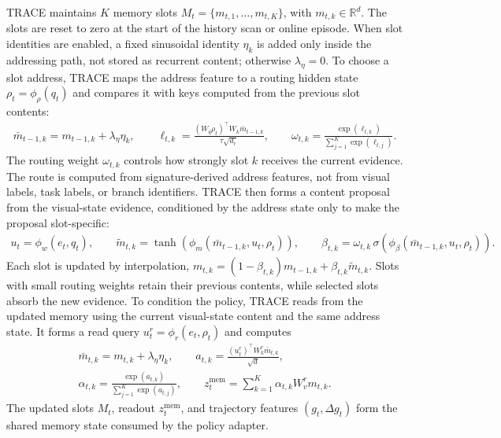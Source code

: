 \documentclass{article}
\begin{document}
TRACE maintains $K$ memory slots $M_t=\{m_{t,1},\ldots,m_{t,K}\}$, with $m_{t,k}\in\mathbb{R}^{d}$. The slots are reset to zero at the start of the history scan or online episode. When slot identities are enabled, a fixed sinusoidal identity $\eta_k$ is added only inside the addressing path, not stored as recurrent content; otherwise $\lambda_{\eta}=0$. To choose a slot address, TRACE maps the address feature to a routing hidden state $\rho_t=\phi_{\rho}(q_t)$ and compares it with keys computed from the previous slot contents:
\begin{align}
    \bar m_{t-1,k}=m_{t-1,k}+\lambda_{\eta}\eta_k,
    \qquad
    \ell_{t,k}=
    \frac{(W_q\rho_t)^\top W_k \bar m_{t-1,k}}
    {\tau\sqrt{d_r}},
    \qquad
    \omega_{t,k}=\frac{\exp(\ell_{t,k})}{\sum_{j=1}^{K}\exp(\ell_{t,j})}.
    \label{eq:route_weights}
\end{align}
The routing weight $\omega_{t,k}$ controls how strongly slot $k$ receives the current evidence. The route is computed from signature-derived address features, not from visual labels, task labels, or branch identifiers. TRACE then forms a content proposal from the visual-state evidence, conditioned by the address state only to make the proposal slot-specific:
\begin{align}
    u_t=\phi_w(e_t,q_t),
    \qquad
    \tilde m_{t,k}=\tanh(\phi_m(\bar m_{t-1,k},u_t,\rho_t)),
    \qquad
    \beta_{t,k}
    =
    \omega_{t,k}\,
    \sigma\!\left(\phi_{\beta}(\bar m_{t-1,k},u_t,\rho_t)\right).
    \label{eq:write_strength}
\end{align}
Each slot is updated by interpolation,
$m_{t,k}=(1-\beta_{t,k})m_{t-1,k}+\beta_{t,k}\tilde m_{t,k}$. Slots with small routing weights retain their previous contents, while selected slots absorb the new evidence. To condition the policy, TRACE reads from the updated memory using the current visual-state content and the same address state. It forms a read query $u_t^{r}=\phi_r(e_t,\rho_t)$ and computes
\begin{align}
    \bar m_{t,k}=m_{t,k}+\lambda_{\eta}\eta_k,
    \qquad
    a_{t,k}=
    \frac{(u_t^{r})^\top W_k^{r}\bar m_{t,k}}{\sqrt d},
    \\
    \alpha_{t,k}=
    \frac{\exp(a_{t,k})}{\sum_{j=1}^{K}\exp(a_{t,j})},
    \qquad
    z_t^{\mathrm{mem}}=\sum_{k=1}^{K}\alpha_{t,k}W_v^{r}m_{t,k}.
    \label{eq:memory_readout}
\end{align}
The updated slots $M_t$, readout $z_t^{\mathrm{mem}}$, and trajectory features $(g_t,\Delta g_t)$ form the shared memory state consumed by the policy adapter.
\end{document}
